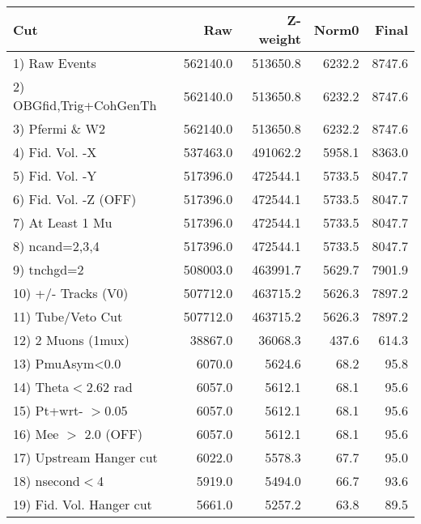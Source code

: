  \begin{table}[h!]\centering
 \begin{tabular}{||l||r|r|r|r||}
 \hline
 \hline
 Cut & Raw & Z-weight & Norm0 & Final \\
 \hline
  1) Raw Events           &    562140.0 &    513650.8 &      6232.2 &      8747.6 \\
  2) OBGfid,Trig+CohGenTh &    562140.0 &    513650.8 &      6232.2 &      8747.6 \\
  3) Pfermi \& W2         &    562140.0 &    513650.8 &      6232.2 &      8747.6 \\
  4) Fid. Vol. -X         &    537463.0 &    491062.2 &      5958.1 &      8363.0 \\
  5) Fid. Vol. -Y         &    517396.0 &    472544.1 &      5733.5 &      8047.7 \\
  6) Fid. Vol. -Z (OFF)   &    517396.0 &    472544.1 &      5733.5 &      8047.7 \\
  7) At Least 1 Mu        &    517396.0 &    472544.1 &      5733.5 &      8047.7 \\
  8) ncand=2,3,4          &    517396.0 &    472544.1 &      5733.5 &      8047.7 \\
  9) tnchgd=2             &    508003.0 &    463991.7 &      5629.7 &      7901.9 \\
 10) +/- Tracks (V0)      &    507712.0 &    463715.2 &      5626.3 &      7897.2 \\
 11) Tube/Veto Cut        &    507712.0 &    463715.2 &      5626.3 &      7897.2 \\
 12) 2 Muons (1mux)       &     38867.0 &     36068.3 &       437.6 &       614.3 \\
 13) PmuAsym<0.0          &      6070.0 &      5624.6 &        68.2 &        95.8 \\
 14) Theta$<$2.62 rad     &      6057.0 &      5612.1 &        68.1 &        95.6 \\
 15) Pt+wrt- $>$0.05      &      6057.0 &      5612.1 &        68.1 &        95.6 \\
 16) Mee $>$ 2.0  (OFF)   &      6057.0 &      5612.1 &        68.1 &        95.6 \\
 17) Upstream Hanger cut  &      6022.0 &      5578.3 &        67.7 &        95.0 \\
 18) nsecond$<$4          &      5919.0 &      5494.0 &        66.7 &        93.6 \\
 19) Fid. Vol. Hanger cut &      5661.0 &      5257.2 &        63.8 &        89.5 \\

\end{tabular}
\end{table}
